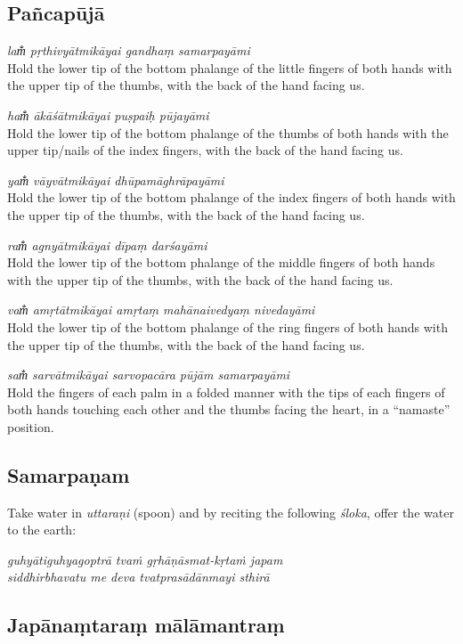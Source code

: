\documentclass[12pt,oneside,a4paper]{article}
\newenvironment{shloka}[1]
  {\bigskip\center#1\varwidth{\linewidth}}
  {\endvarwidth\endcenter\bigskip}
\newcommand{\tl}[1]{\emph{#1}}
\begin{document}
\subsection{Pañcapūjā}

\tl{lam̐ pṛthivyātmikāyai gandhaṃ samarpayāmi}\\
Hold the lower tip of the bottom phalange of the little fingers of both hands
with the upper tip of the thumbs, with the back of the hand facing us.

\tl{ham̐ ākāśātmikāyai puṣpaiḥ pūjayāmi}\\
Hold the lower tip of the bottom phalange of the thumbs of both hands with
the upper tip/nails of the index fingers, with the back of the hand facing us.

\tl{yam̐ vāyvātmikāyai dhūpamāghrāpayāmi}\\
Hold the lower tip of the bottom phalange of the index fingers of both hands
with the upper tip of the thumbs, with the back of the hand facing us.

\tl{ram̐ agnyātmikāyai dīpaṃ darśayāmi}\\
Hold the lower tip of the bottom phalange of the middle fingers of both hands
with the upper tip of the thumbs, with the back of the hand facing us.

\tl{vam̐ amṛtātmikāyai amṛtaṃ mahānaivedyaṃ nivedayāmi}\\
Hold the lower tip of the bottom phalange of the ring fingers of both hands with
the upper tip of the thumbs, with the back of the hand facing us.

\tl{sam̐ sarvātmikāyai sarvopacāra pūjām samarpayāmi}\\
Hold the fingers of each palm in a folded manner with the tips of each fingers
of both hands touching each other and the thumbs facing the heart, in
a ``namaste'' position.

\subsection{Samarpaṇam}

Take water in \tl{uttaraṇi} (spoon) and by reciting the following \tl{śloka},
offer the water to the earth:

\begin{shloka}\itshape
  guhyātiguhyagoptrā tvaṁ gṛhāṇāsmat-kṛtaṁ japam\\
  siddhirbhavatu me deva tvatprasādānmayi sthirā
\end{shloka}

\subsection{Japānaṃtaraṃ mālāmantraṃ}
\end{document}
